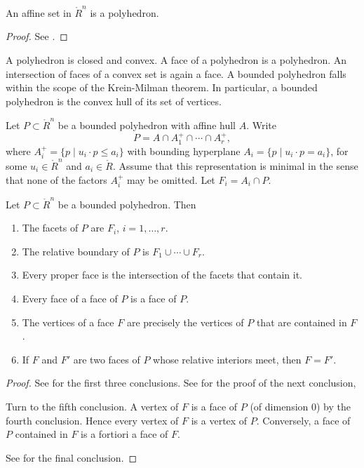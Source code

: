 \begin{lemma}
An affine set in $\ring{R}^n$ is a polyhedron.
\end{lemma}

\begin{proof} See \cite[Cor~1.4.2]{webster:1994}.
\end{proof}

A polyhedron is closed and convex.  A face of a polyhedron is a polyhedron.  An intersection of faces of a convex set is again a face.  A bounded polyhedron falls within the scope of the Krein-Milman theorem.  In particular, a bounded polyhedron is the convex hull of its set of vertices.

Let $P\subset\ring{R}^n$ be a bounded polyhedron with affine hull $A$. Write 
$$
P = A \cap A^+_1 \cap \cdots \cap A^+_r,
$$
where
$A^+_i = \{p\mid u_i\cdot p \le a_i\}$ with bounding hyperplane
$A_i=\{p\mid u_i \cdot p = a_i\}$, for some $u_i\in \ring{R}^n$ and $a_i\in\ring{R}$. 
Assume that this representation is minimal in the sense that none of the factors $A^+_i$ may be omitted.  Let $F_i = A_i\cap P$.


\begin{lemma}\label{lemma:webster}  
Let $P\subset\ring{R}^n$ be a bounded polyhedron.  Then
\begin{enumerate}
\item The facets of $P$ are $F_i$, $i=1,\ldots,r$.
\item The relative boundary of $P$ is $F_1\cup\cdots \cup F_r$.
\item Every proper face is the intersection of the facets that contain it.
\item Every face of a face of $P$ is a face of $P$.
\item The vertices of a face $F$ are precisely the vertices of $P$ that are contained in $F$.
\item If $F$ and $F'$ are two faces of $P$ whose relative interiors meet, then
$F=F'$.
\end{enumerate}
\end{lemma}

\begin{proof} See \cite[Thm~3.2.1]{webster:1994} for the first three conclusions.
See \cite[Th~2.6.5]{webster:1994} for the proof of the next conclusion,

Turn to the fifth conclusion.  A vertex of $F$ is a face of $P$ (of dimension $0$) by the fourth conclusion.  Hence every vertex of $F$ is a vertex of $P$.  Conversely, a face of $P$ contained in $F$ is a fortiori a face of $F$.

See \cite[Cor~2.6.7]{webster:1994} for the final conclusion.
\end{proof}

